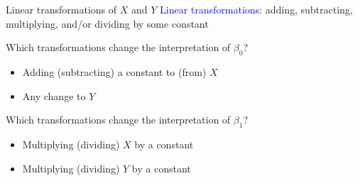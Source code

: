 \documentclass[10pt,t]{beamer}
\begin{document}
\begin{frame}{Linear transformations of $X$ and $Y$}
\textcolor{blue}{Linear transformations:} adding, subtracting, multiplying, and/or dividing by some constant

\vspace{0.3cm}

Which transformations change the interpretation of $\beta_0$? \pause
\medskip
\begin{itemize}
	\item[] Adding (subtracting) a constant to (from) $X$
	\smallskip
	\item[] Any change to $Y$ 
\end{itemize} \pause

\vspace{0.3cm}

Which transformations change the interpretation of $\beta_1$? \pause
\medskip

\begin{itemize}
	\item[] Multiplying (dividing) $X$ by a constant
	\smallskip
	
	\item[] Multiplying (dividing) $Y$ by a constant 
\end{itemize}
\end{frame}
\end{document}
